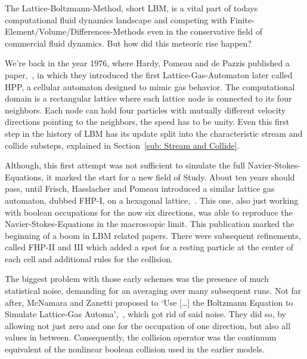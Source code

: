 
The Lattice-Boltzmann-Method, short LBM, is a vital part of todays computational fluid dynamics landscape and competing with Finite-Element/Volume/Differences-Methods even in the conservative field of commercial fluid dynamics. But how did this meteoric rise happen?

We're back in the year 1976, where Hardy, Pomeau and de Pazzis published a paper,~\cite{hardy1976molecular}, in which they introduced the first Lattice-Gas-Automaton later called HPP, a cellular automaton designed to mimic gas behavior. The computational domain is a rectangular lattice where each lattice node is connected to its four neighbors. Each node can hold four particles with mutually different velocity directions pointing to the neighbors, the speed has to be unity. Even this first step in the history of LBM has its update split into the characteristic stream and collide substeps, explained in Section~\ref{sub: Stream and Collide}.

Although, this first attempt was not sufficient to simulate the full Navier-Stokes-Equations, it marked the start for a new field of Study.
About ten years should pass, until Frisch, Hasslacher and Pomeau introduced a similar lattice gas automaton, dubbed FHP-I, on a hexagonal lattice,~\cite{frisch1986lattice}. This one, also just working with boolean occupations for the now six directions, was able to reproduce the Navier-Stokes-Equations in the macroscopic limit. This publication marked the beginning of a boom in LBM related papers. There were subsequent refinements, called FHP-II and III which added a spot for a resting particle at the center of each cell and additional rules for the collision.

The biggest problem with those early schemes was the presence of much statistical noise, demanding for an averaging over many subsequent runs. Not far after, McNamara and Zanetti proposed to `Use [\ldots] the Boltzmann Equation to Simulate Lattice-Gas Automa',~\cite{PhysRevLett.61.2332}, which got rid of said noise. They did so, by allowing not just zero and one for the occupation of one direction, but also all values in between. Consequently, the collision operator was the continuum equivalent of the nonlinear boolean collision used in the earlier models.

